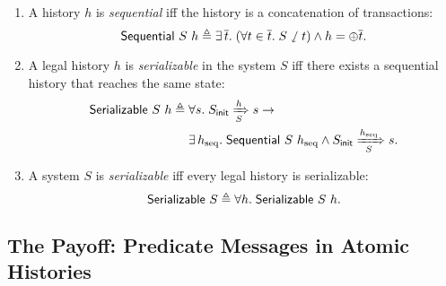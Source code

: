 \documentclass[sigplan,10pt,review,anonymous,screen]{acmart}\settopmatter{printfolios=true,printccs=false,printacmref=false}
\begin{document}
\begin{definition}\mbox{}\vspace{-8pt}\\
  \begin{enumerate}[leftmargin=*]
  \item A history $h$ is \emph{sequential} iff the history is a concatenation of transactions:
    \begin{displaymath}
      \mathsf{Sequential}\ S\ h \triangleq \exists\, \overline{t}.\; (\forall t \in \overline{t}.\; S \sswarrow t) \wedge h = \oplus \overline{t}.
    \end{displaymath}
  \item A legal history $h$ is \emph{serializable} in the system $S$ iff there exists a sequential history that reaches the same state:
    \begin{align*}
      \mathsf{Serializable}\ S\ h \triangleq\; & \forall s.\; S_{\textsf{init}} \xRightarrow[S]{h} s \to\\
      & \exists\, h_{\textrm{seq}}.\; \mathsf{Sequential}\ S\ h_{\textrm{seq}} \wedge S_{\textsf{init}} \xRightarrow[S]{h_{\textrm{seq}}} s.
    \end{align*}
  \item A system $S$ is \emph{serializable} iff every legal history is serializable:
    \begin{displaymath}
      \mathsf{Serializable}\ S \triangleq \forall h.\; \mathsf{Serializable}\ S\ h.
    \end{displaymath}
  \end{enumerate}
  \label{def-sz}
\end{definition}

\subsection{The Payoff: Predicate Messages in Atomic Histories}
\label{sec-atomic-invariants}

\newcommand{\msgsf}[1]{\ensuremath{\textsf{#1}}}
\newcommand{\msgsfsm}[1]{{\small\ensuremath{\textsf{#1}}}}
\newcommand{\rdmsg}[1]{{\color{myred}\msgsf{#1}}}
\newcommand{\rdmsgsm}[1]{{\color{myred}\msgsfsm{#1}}}
\newcommand{\blmsg}[1]{{\color{myblue}\msgsf{#1}}}
\newcommand{\blmsgsm}[1]{{\color{myblue}\msgsfsm{#1}}}
\newcommand{\idmsf}[2]{\idmbuild{#1}{\textsf{#2}}}
\newcommand{\spredmsg}[3]{\ensuremath{#1 \vdash #2\{#3\}}}
\newcommand{\predmsg}[2]{\ensuremath{#1\{#2\}}}

\newcommand{\rulelbl}[2]{\ensuremath{#1:(#2)}}
\newcommand{\rdrulelbl}[2]{{\small\color{myred}\rulelbl{#1}{#2}}}
\newcommand{\blrulelbl}[2]{{\small\color{myblue}\rulelbl{#1}{#2}}}
\end{document}

